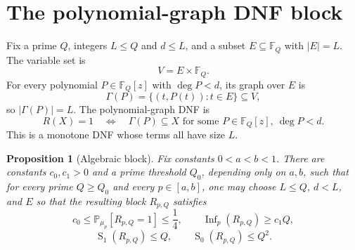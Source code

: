 \documentclass[11pt]{article}
\newtheorem{proposition}[theorem]{Proposition}
\newcommand{\F}{\mathbb F}
\newcommand{\Prb}{\mathbb P}
\newcommand{\Inf}{\operatorname{Inf}}
\newcommand{\sens}{\operatorname{S}}
\begin{document}
\section{The polynomial-graph DNF block}\label{sec:block}

Fix a prime \(Q\), integers \(L\le Q\) and \(d\le L\), and a subset \(E\subseteq\F_Q\) with \(|E|=L\). The variable set is
\[
    V=E\times\F_Q.
\]
For every polynomial \(P\in\F_Q[z]\) with \(\deg P<d\), its graph over \(E\) is
\[
    \Gamma(P)=\bigl\{(t,P(t)):t\in E\bigr\}\subseteq V,
\]
so \(|\Gamma(P)|=L\). The polynomial-graph DNF is
\[
    R(X)=1
    \quad\Longleftrightarrow\quad
    \Gamma(P)\subseteq X
    \text{ for some }P\in\F_Q[z],\ \deg P<d.
\]
This is a monotone DNF whose terms all have size \(L\).

\begin{proposition}[Algebraic block]\label{prop:block}
Fix constants \(0<a<b<1\). There are constants \(c_0,c_1>0\) and a prime threshold \(Q_0\), depending only on \(a,b\), such that for every prime \(Q\ge Q_0\) and every \(p\in[a,b]\), one may choose \(L\le Q\), \(d<L\), and \(E\) so that the resulting block \(R_{p,Q}\) satisfies
\[
    c_0\le \Prb_{\mu_p}[R_{p,Q}=1]\le \frac14,
    \qquad
    \Inf_p(R_{p,Q})\ge c_1 Q,
\]
\[
    \sens_1(R_{p,Q})\le Q,
    \qquad
    \sens_0(R_{p,Q})\le Q^2.
\]
\end{proposition}
\end{document}
